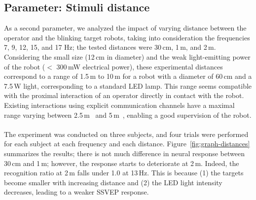 \documentclass[smallextended]{svjour3}
\begin{document}
\subsection{Parameter: Stimuli distance}
As a second parameter, we analyzed the impact of varying distance between the operator and the blinking target robots, taking into consideration the frequencies 7, 9, 12, 15, and 17 Hz; the tested distances were 30\,cm, 1\,m, and 2\,m. 
Considering the small size (12\,cm in diameter) and the weak light-emitting power of the robot ($<$ 300\,mW electrical power), these experimental distances correspond to a range of 1.5\,m to 10\,m for a robot with a diameter of 60\,cm and a 7.5\,W light, corresponding to a standard LED lamp. 
This range seems compatible with the proximal interaction of an operator directly in contact with the robot.
Existing interactions using explicit communication channels have a maximal range varying between 2.5\,m~\cite{Pourmehr2013} and 5\,m~\cite{Nagietal2014}, enabling a good supervision of the robot.\\
\\
The experiment was conducted on three subjects, and four trials were performed for each subject at each frequency and each distance.
Figure~\ref{fig:graph-distances} summarizes the results; there is not much difference in neural response between 30\,cm and 1\,m; however, the response starts to deteriorate at 2\,m. Indeed, the recognition ratio at 2\,m falls under 1.0 at 13\,Hz. 
This is because (1) the targets become smaller with increasing distance and (2) the LED light intensity decreases, leading to a weaker SSVEP response.
\end{document}
